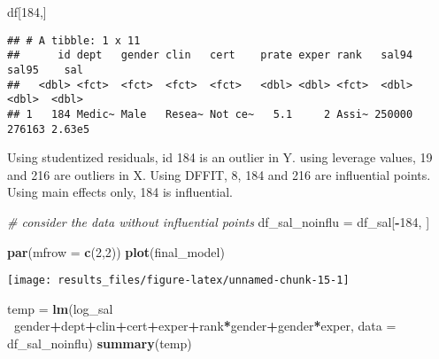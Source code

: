 \documentclass[]{article}
\newenvironment{Shaded}{\begin{snugshade}}{\end{snugshade}}
\newcommand{\CommentTok}[1]{\textcolor[rgb]{0.56,0.35,0.01}{\textit{#1}}}
\newcommand{\DataTypeTok}[1]{\textcolor[rgb]{0.13,0.29,0.53}{#1}}
\newcommand{\DecValTok}[1]{\textcolor[rgb]{0.00,0.00,0.81}{#1}}
\newcommand{\KeywordTok}[1]{\textcolor[rgb]{0.13,0.29,0.53}{\textbf{#1}}}
\newcommand{\NormalTok}[1]{#1}
\newcommand{\OperatorTok}[1]{\textcolor[rgb]{0.81,0.36,0.00}{\textbf{#1}}}
\newcommand{\StringTok}[1]{\textcolor[rgb]{0.31,0.60,0.02}{#1}}
\begin{document}
\begin{Shaded}
\begin{Highlighting}[]
\NormalTok{df[}\DecValTok{184}\NormalTok{,]}
\end{Highlighting}
\end{Shaded}

\begin{verbatim}
## # A tibble: 1 x 11
##      id dept   gender clin   cert    prate exper rank   sal94  sal95    sal
##   <dbl> <fct>  <fct>  <fct>  <fct>   <dbl> <dbl> <fct>  <dbl>  <dbl>  <dbl>
## 1   184 Medic~ Male   Resea~ Not ce~   5.1     2 Assi~ 250000 276163 2.63e5
\end{verbatim}

Using studentized residuals, id 184 is an outlier in Y. using leverage
values, 19 and 216 are outliers in X. Using DFFIT, 8, 184 and 216 are
influential points. Using main effects only, 184 is influential.

\begin{Shaded}
\begin{Highlighting}[]
\CommentTok{# consider the data without influential points}
\NormalTok{df_sal_noinflu =}\StringTok{ }\NormalTok{df_sal[}\OperatorTok{-}\DecValTok{184}\NormalTok{, ]}

\KeywordTok{par}\NormalTok{(}\DataTypeTok{mfrow =} \KeywordTok{c}\NormalTok{(}\DecValTok{2}\NormalTok{,}\DecValTok{2}\NormalTok{))}
\KeywordTok{plot}\NormalTok{(final_model)}
\end{Highlighting}
\end{Shaded}

\texttt{[image: results\_files/figure-latex/unnamed-chunk-15-1]}

\begin{Shaded}
\begin{Highlighting}[]
\NormalTok{temp =}\StringTok{ }\KeywordTok{lm}\NormalTok{(log_sal }\OperatorTok{~}\NormalTok{gender}\OperatorTok{+}\NormalTok{dept}\OperatorTok{+}\NormalTok{clin}\OperatorTok{+}\NormalTok{cert}\OperatorTok{+}\NormalTok{exper}\OperatorTok{+}\NormalTok{rank}\OperatorTok{*}\NormalTok{gender}\OperatorTok{+}\NormalTok{gender}\OperatorTok{*}\NormalTok{exper, }\DataTypeTok{data =}\NormalTok{ df_sal_noinflu)}
\KeywordTok{summary}\NormalTok{(temp)}
\end{Highlighting}
\end{Shaded}
\end{document}

